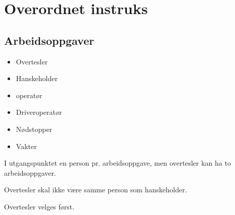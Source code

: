 \section{Overordnet instruks}

\subsection*{Arbeidsoppgaver}

\begin{itemize}
\item
  {Overtesler}
\item
  {Hanskeholder}
\item
  {\Pulsformer operatør}
\item
  {Driveroperatør}
\item
  {Nødstopper}
\item
  {Vakter}
\end{itemize}
{}

{I utgangspunktet en person pr. arbeidsoppgave, men overtesler kan ha to
arbeidsoppgaver.}\\

{}

{Overtesler skal ikke være samme person som hanskeholder.}\\

{}

{Overtesler velges først.}